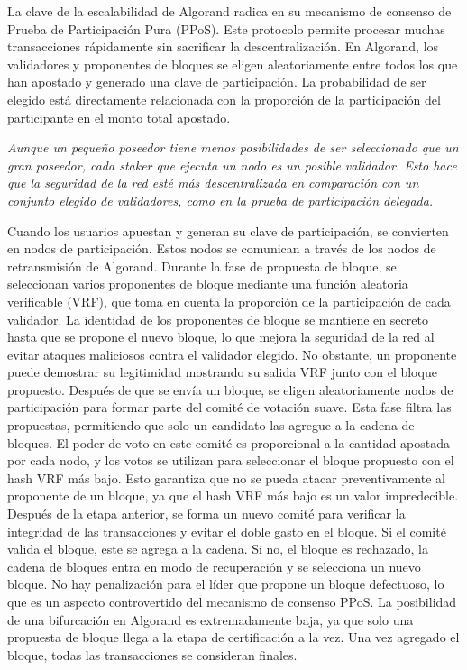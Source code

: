 \documentclass{article}
\begin{document}
La clave de la escalabilidad de Algorand radica en su mecanismo de consenso de Prueba de Participación Pura (PPoS). Este protocolo permite procesar muchas transacciones rápidamente sin sacrificar la descentralización. En Algorand, los validadores y proponentes de bloques se eligen aleatoriamente entre todos los que han apostado y generado una clave de participación. La probabilidad de ser elegido está directamente relacionada con la proporción de la participación del participante en el monto total apostado.


\textit{Aunque un pequeño poseedor tiene menos posibilidades de ser seleccionado que un gran poseedor, cada staker que ejecuta un nodo es un posible validador. Esto hace que la seguridad de la red esté más descentralizada en comparación con un conjunto elegido de validadores, como en la prueba de participación delegada.}


Cuando los usuarios apuestan y generan su clave de participación, se convierten en nodos de participación. Estos nodos se comunican a través de los nodos de retransmisión de Algorand. Durante la fase de propuesta de bloque, se seleccionan varios proponentes de bloque mediante una función aleatoria verificable (VRF), que toma en cuenta la proporción de la participación de cada validador. La identidad de los proponentes de bloque se mantiene en secreto hasta que se propone el nuevo bloque, lo que mejora la seguridad de la red al evitar ataques maliciosos contra el validador elegido. No obstante, un proponente puede demostrar su legitimidad mostrando su salida VRF junto con el bloque propuesto.
Después de que se envía un bloque, se eligen aleatoriamente nodos de participación para formar parte del comité de votación suave. Esta fase filtra las propuestas, permitiendo que solo un candidato las agregue a la cadena de bloques. El poder de voto en este comité es proporcional a la cantidad apostada por cada nodo, y los votos se utilizan para seleccionar el bloque propuesto con el hash VRF más bajo. Esto garantiza que no se pueda atacar preventivamente al proponente de un bloque, ya que el hash VRF más bajo es un valor impredecible.
Después de la etapa anterior, se forma un nuevo comité para verificar la integridad de las transacciones y evitar el doble gasto en el bloque. Si el comité valida el bloque, este se agrega a la cadena. Si no, el bloque es rechazado, la cadena de bloques entra en modo de recuperación y se selecciona un nuevo bloque. No hay penalización para el líder que propone un bloque defectuoso, lo que es un aspecto controvertido del mecanismo de consenso PPoS. La posibilidad de una bifurcación en Algorand es extremadamente baja, ya que solo una propuesta de bloque llega a la etapa de certificación a la vez. Una vez agregado el bloque, todas las transacciones se consideran finales.
\end{document}
